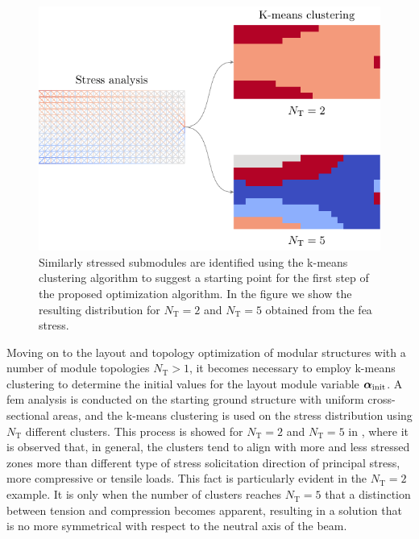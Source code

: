 \begin{figure}
    \centering
    \includegraphics{figures/06_DMO/00_optimized_modules/kmeans.pdf}
    \caption{Similarly stressed submodules are identified using the k-means clustering algorithm to suggest a starting point for the first step of the proposed optimization algorithm. In the figure we show the resulting distribution for $N_\text{T}=2$ and $N_\text{T}=5$ obtained from the \gls{fea} stress.}
    \label{fig:06_cant_kmeans}
\end{figure}

Moving on to the layout and topology optimization of modular structures with a number of module topologies $N_\text{T} > 1$, it becomes necessary to employ k-means clustering to determine the initial values for the layout module variable  $\bm{\alpha}_\text{init}$. A \gls{fem} analysis is conducted on the starting ground structure with uniform cross-sectional areas, and the k-means clustering is used on the stress distribution using $N_\text{T}$ different clusters. This process is showed for $N_\text{T}=2$ and $N_\text{T}=5$ in , where it is observed that, in general, the clusters tend to align with more and less stressed zones more than different type of stress solicitation \ie direction of principal stress, more compressive or tensile loads. This fact is particularly evident in the $N_\text{T}=2$ example. It is only when the number of clusters reaches $N_\text{T}=5$ that a distinction between tension and compression becomes apparent, resulting in a solution that is no more symmetrical with respect to the neutral axis of the beam.

